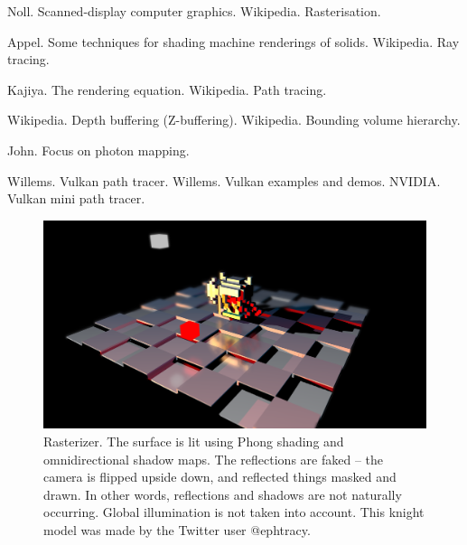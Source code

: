 \documentclass[10pt]{article}
\begin{document}
\begin{thebibliography}{9}

 Noll. Scanned-display computer graphics.
 Wikipedia. Rasterisation.

 Appel. Some techniques for shading machine renderings of solids.
 Wikipedia. Ray tracing.

 Kajiya. The rendering equation.
 Wikipedia. Path tracing.

 Wikipedia. Depth buffering (Z-buffering).
 Wikipedia. Bounding volume hierarchy.

 John. Focus on photon mapping.

 Willems. Vulkan path tracer.
 Willems. Vulkan examples and demos.
 NVIDIA. Vulkan mini path tracer.



\end{thebibliography}


\pagebreak




\begin{figure} 
\centering
  \includegraphics[width = 6 in]{rasterizer.png}
  \caption{ Rasterizer.
The surface is lit using Phong shading and omnidirectional shadow maps.
The reflections are faked -- the camera is flipped upside down, and reflected things masked and drawn.
In other words, reflections and shadows are not naturally occurring.
Global illumination is not taken into account.
This knight model was made by the Twitter user @ephtracy.
}

\end{figure}
\end{document}
